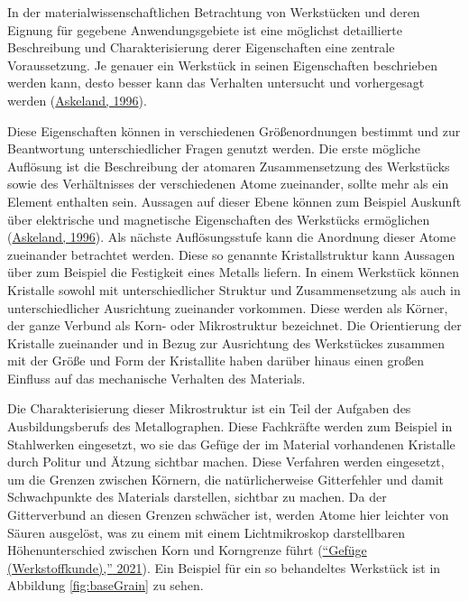\documentclass[
  12pt,
  openany]{book}
\begin{document}
In der materialwissenschaftlichen Betrachtung von Werkstücken und deren Eignung für gegebene Anwendungsgebiete ist eine möglichst detaillierte Beschreibung und Charakterisierung derer Eigenschaften eine zentrale Voraussetzung. Je genauer ein Werkstück in seinen Eigenschaften beschrieben werden kann, desto besser kann das Verhalten untersucht und vorhergesagt werden (\protect\hyperlink{ref-askelandMaterialwissenschaftenGrundlagenUbungen1996}{Askeland, 1996}).

Diese Eigenschaften können in verschiedenen Größenordnungen bestimmt und zur Beantwortung unterschiedlicher Fragen genutzt werden.
Die erste mögliche Auflösung ist die Beschreibung der atomaren Zusammensetzung des Werkstücks sowie des Verhältnisses der verschiedenen Atome zueinander, sollte mehr als ein Element enthalten sein. Aussagen auf dieser Ebene können zum Beispiel Auskunft über elektrische und magnetische Eigenschaften des Werkstücks ermöglichen (\protect\hyperlink{ref-askelandMaterialwissenschaftenGrundlagenUbungen1996}{Askeland, 1996}).
Als nächste Auflösungsstufe kann die Anordnung dieser Atome zueinander betrachtet werden. Diese so genannte Kristallstruktur kann Aussagen über zum Beispiel die Festigkeit eines Metalls liefern.
In einem Werkstück können Kristalle sowohl mit unterschiedlicher Struktur und Zusammensetzung als auch in unterschiedlicher Ausrichtung zueinander vorkommen. Diese werden als Körner, der ganze Verbund als Korn- oder Mikrostruktur bezeichnet.
Die Orientierung der Kristalle zueinander und in Bezug zur Ausrichtung des Werkstückes zusammen mit der Größe und Form der Kristallite haben darüber hinaus einen großen Einfluss auf das mechanische Verhalten des Materials.

Die Charakterisierung dieser Mikrostruktur ist ein Teil der Aufgaben des Ausbildungsberufs des Metallographen. Diese Fachkräfte werden zum Beispiel in Stahlwerken eingesetzt, wo sie das Gefüge der im Material vorhandenen Kristalle durch Politur und Ätzung sichtbar machen. Diese Verfahren werden eingesetzt, um die Grenzen zwischen Körnern, die natürlicherweise Gitterfehler und damit Schwachpunkte des Materials darstellen, sichtbar zu machen. Da der Gitterverbund an diesen Grenzen schwächer ist, werden Atome hier leichter von Säuren ausgelöst, was zu einem mit einem Lichtmikroskop darstellbaren Höhenunterschied zwischen Korn und Korngrenze führt (\protect\hyperlink{ref-GefugeWerkstoffkunde2021}{{``Gefüge (Werkstoffkunde),''} 2021}). Ein Beispiel für ein so behandeltes Werkstück ist in Abbildung \ref{fig:baseGrain} zu sehen.
\end{document}
